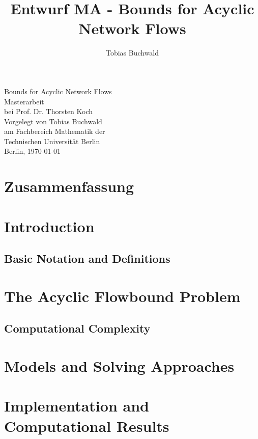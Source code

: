 \documentclass[a4paper]{book}
\theoremstyle{definition}
\theoremstyle{Tobi}
\begin{document}
\title{Entwurf MA - Bounds for Acyclic Network Flows}

\author{Tobias Buchwald}



\begin{center} 

\Huge{Bounds for Acyclic Network Flows}\\ \vspace{12 cm}
\Large{Masterarbeit\\ bei Prof. Dr. Thorsten Koch}\\ \vspace{1cm}
\large{Vorgelegt von Tobias Buchwald}\\
\large{am Fachbereich Mathematik der \\Technischen Universit\"at Berlin}\\
\vspace{2cm}
\large{Berlin,  \today}

\end{center} 
\newpage
\mbox{}
\newpage
{}

\newpage
\mbox{}
\newpage
\tableofcontents
\newpage
\chapter*{Zusammenfassung}
\newpage
\chapter{Introduction} 
\newpage
% 
\section{Basic Notation and Definitions}
\newpage
\chapter{The Acyclic Flowbound Problem}
\section{Computational Complexity}
\newpage
\chapter{Models and Solving Approaches}
\newpage
\chapter{Implementation and Computational Results}


\newpage
\newpage
{}

% 

\nocite{*}
\end{document}
